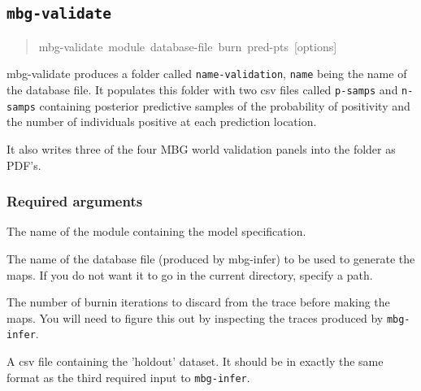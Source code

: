 \subsection{\texttt{mbg-validate}%
}
%
\begin{quote}{\ttfamily \raggedright \noindent
mbg-validate~module~database-file~burn~pred-pts~{[}options{]}
}
\end{quote}

mbg-validate produces a folder called \texttt{name-validation}, \texttt{name} being the name of the database file.
It populates this folder with two csv files called \texttt{p-samps} and \texttt{n-samps} containing posterior
predictive samples of the probability of positivity and the number of individuals positive at each
prediction location.

It also writes three of the four MBG world validation panels into the folder as PDF's.




\subsubsection{Required arguments%
}
\setcounter{listcnt0}{0}
\begin{list}{.}
{
\setlength{\rightmargin}{\leftmargin}
}

\item The name of the module containing the model specification.

\item The name of the database file (produced by mbg-infer) to be used to generate the
maps. If you do not want it to go in the current directory, specify a path.

\item The number of burnin iterations to discard from the trace before making the maps.
You will need to figure this out by inspecting the traces produced by \texttt{mbg-infer}.

\item A csv file containing the 'holdout' dataset. It should be in exactly the same format
as the third required input to \texttt{mbg-infer}.
\end{list}




